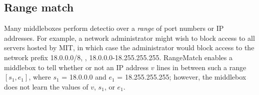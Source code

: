 

%
%
%
%
%
%
%
%
%
%
%
%

\subsection{Range match } \label{sec:range}




Many middleboxes perform detectio over a {\it range} of port numbers or IP addresses. For example, a network administrator might wish to block access to all servers hosted by MIT, in which case the administrator would block access to the network prefix 18.0.0.0/8, \ie{}, 18.0.0.0-18.255.255.255. RangeMatch enables a middlebox to tell whether or not an IP address $v$ lines in between such a range $[s_1, e_1]$, where $s_1$ = 18.0.0.0 and $e_1$ = 18.255.255.255; however, the middlebox does not learn the values of $v$, $s_1$, or $e_1$.

